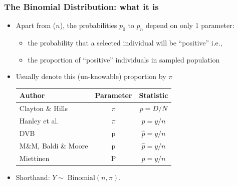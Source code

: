 \documentclass[10pt]{beamer}\usepackage[]{graphicx}\usepackage[]{color}
\begin{document}
\begin{frame}
	\frametitle{The Binomial Distribution: what it is}
	\begin{itemize}
		\setlength\itemsep{0.5em}
		\item Apart from  ($n$), the probabilities $p_{0}$ to $p_{n}$ depend on only 1 parameter:
		\begin{itemize}
			\item the probability that a selected individual will be ``positive''  i.e.,
			\item the proportion of ``positive'' individuals in sampled population
		\end{itemize}
		
		\item Usually denote this (un-knowable) proportion by $\pi$
		
		\begin{tabular}{lcc}
			\hline
			Author & \textbf{Parameter} & \textbf{Statistic} \\
			\hline
			Clayton \& Hills   & $\pi $ & $p= D/N$ \\
			Hanley et al. & $\pi $ & $p= y/n$ \\
			DVB & p &$\hat{p} = y/n$ \\
			M\&M, Baldi \& Moore & p &$\hat{p} = y/n$ \\
			Miettinen& P & $p=y/n$ \\
			\hline
		\end{tabular}
		\item
		Shorthand:  $Y\sim\; \textrm{Binomial}(n, \pi)$.
	\end{itemize}
\end{frame}
\end{document}
